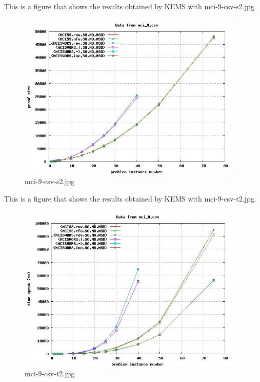 This is a figure that shows the results obtained by KEMS with mci-9-csv-s2.jpg.
\begin{figure}[htbp]
\begin{center}
\includegraphics[width=0.95\textwidth]{figuras/mci-9-csv-s2.jpg}
\end{center}
\caption{mci-9-csv-s2.jpg}
\end{figure}

This is a figure that shows the results obtained by KEMS with mci-9-csv-t2.jpg.
\begin{figure}[htbp]
\begin{center}
\includegraphics[width=0.95\textwidth]{figuras/mci-9-csv-t2.jpg}
\end{center}
\caption{mci-9-csv-t2.jpg}
\end{figure}

